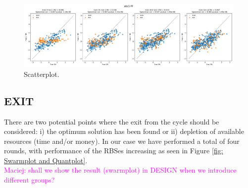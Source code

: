 \documentclass{article}
\newcommand{\mengyan}[1]{\textcolor{magenta}{#1}}
\begin{document}

\begin{figure}[h]
    \centering
    \includegraphics[scale=0.32]{paper/plots/scatter_abc1_FF.pdf}
    \caption{Scatterplot.}
    \label{fig: Scatterplot}
\end{figure}

\subsection{EXIT}
There are two potential points where the exit from the cycle should be considered: i) the optimum solution has been found or ii) depletion of available resources (time and/or money). In our case we have performed a total of four rounds, with performance of the RBSes increasing as seen in Figure \ref{fig: Swarmplot and Quantplot}.\\
\mengyan{Maciej: shall we show the result (swarmplot) in DESIGN when we introduce different groups?}
\end{document}
